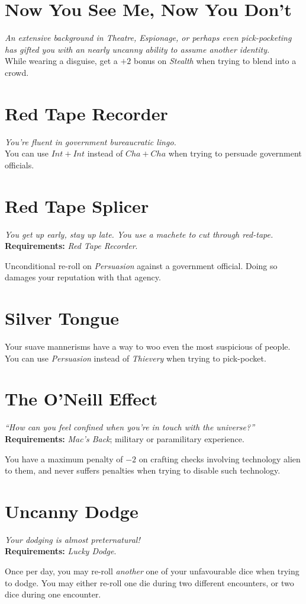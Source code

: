 \section{Now You See Me, Now You Don't}
\textit{An extensive background in Theatre, Espionage, or perhaps even pick-pocketing has gifted you with an nearly uncanny ability to assume another identity.}\\
While wearing a disguise, get a $+2$ bonus on \textit{Stealth} when trying to blend into a crowd.

\section{Red Tape Recorder}
\textit{You're fluent in government bureaucratic lingo.}\\ 
You can use $Int + Int$ instead of $Cha + Cha$ when trying to persuade government officials.

\section{Red Tape Splicer}
\textit{You get up early, stay up late. You use a machete to cut through red-tape.}\\
\textbf{Requirements:} \textit{Red Tape Recorder}.

Unconditional re-roll on \textit{Persuasion} against a government official.
Doing so damages your reputation with that agency.

\section{Silver Tongue}
Your suave mannerisms have a way to woo even the most suspicious of people.
You can use \textit{Persuasion} instead of \textit{Thievery} when trying to pick-pocket.

\section{The O'Neill Effect}
\textit{``How can you feel confined when you're in touch with the universe?''}\\
\textbf{Requirements:} \textit{Mac's Back}; military or paramilitary experience. 

You have a maximum penalty of $-2$ on crafting checks involving technology alien to them, and never suffers penalties when trying to disable such technology.

\section{Uncanny Dodge}
\textit{Your dodging is almost preternatural!}\\
\textbf{Requirements:} \textit{Lucky Dodge}.

Once per day, you may re-roll \textit{another} one of your unfavourable dice when trying to dodge.
You may either re-roll one die during two different encounters, or two dice during one encounter.